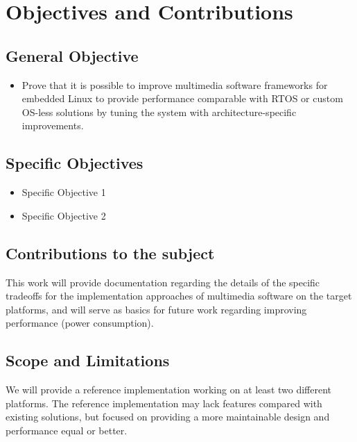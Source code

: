 \chapter{Objectives and Contributions}

\section{General Objective}

\begin{itemize}
\item Prove that it is possible to improve multimedia software frameworks for embedded Linux to provide performance comparable with \ac{RTOS} or custom \ac{OS}-less solutions by tuning the system with architecture-specific improvements.
\end{itemize}

\section{Specific Objectives}
\begin{itemize}
\item Specific Objective 1
\item Specific Objective 2
\end{itemize}

\section{Contributions to the subject}
This work will provide documentation regarding the details of the specific tradeoffs for the implementation approaches of multimedia software on the target platforms, and will serve as basics for future work regarding improving performance (power consumption).

\section{Scope and Limitations}

We will provide a reference implementation working on at least two different platforms. The reference implementation may lack features compared with existing solutions, but focused on providing a more maintainable design and performance equal or better.
 